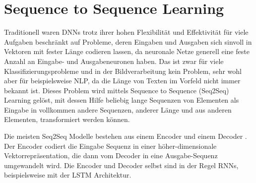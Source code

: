 \documentclass[conference]{IEEEtran}
\begin{document}
\section{Sequence to Sequence Learning}
Traditionell waren DNNs trotz ihrer hohen Flexibilität und Effektivität für viele Aufgaben beschränkt auf Probleme, deren Eingaben und Ausgaben sich sinvoll in Vektoren mit fester Länge codieren lassen, da neuronale Netze generell eine feste Anzahl an Eingabe- und Ausgabeneuronen haben. Das ist zwar für viele Klassifizierungsprobleme und in der Bildverarbeitung kein Problem, sehr wohl aber für beispielsweise NLP, da die Länge von Texten im Vorfeld nicht immer bekannt ist. Dieses Problem wird mittels Sequence to Sequence (Seq2Seq) Learning gelöst, mit dessen Hilfe beliebig lange Sequenzen von Elementen als Eingabe in vollkommen andere Sequenzen, anderer Länge und aus anderen Elementen, transformiert werden können. \cite{sequence_to_sequence}

Die meisten Seq2Seq Modelle bestehen aus einem Encoder und einem Decoder \cite{attention_is_all_you_need}. Der Encoder codiert die Eingabe Sequenz in einer höher-dimensionale Vektorrepräsentation, die dann vom Decoder in eine Ausgabe-Sequenz umgewandelt wird. Die Encoder und Decoder selbst sind in der Regel RNNs, beispielsweise mit der LSTM Architektur.
\end{document}
